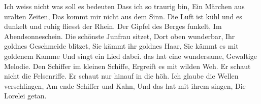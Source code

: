 \beginverse*
Ich weiss nicht was soll es bedeuten
Dass ich so traurig bin,
Ein Märchen aus uralten Zeiten,
Das kommt mir nicht aus dem Sinn.
Die Luft ist kühl und es dunkelt
und ruhig fliesst der Rhein.
Der Gipfel des Berges funkelt,
Im Abendsonneschein.
\endverse
\beginverse*
Die schönste Junfrau sitzet,
Dort oben wunderbar,
Ihr goldnes Geschmeide blitzet,
Sie kämmt ihr goldnes Haar,
Sie kämmt es mit goldenem Kamme
Und singt ein Lied dabei.
das hat eine wundersame,
Gewaltige Melodie. 
\endverse
\beginverse*
Den Schiffer im kleinen Schiffe,
Ergreift es mit wilden Weh.
Er schaut nicht die Felsenriffe.
Er schaut nur hinauf in die höh.
Ich glaube die Wellen verschlingen,
Am ende Schiffer und Kahn, 
Und das hat mit ihrem singen,
Die Lorelei getan.
\endverse
\endsong